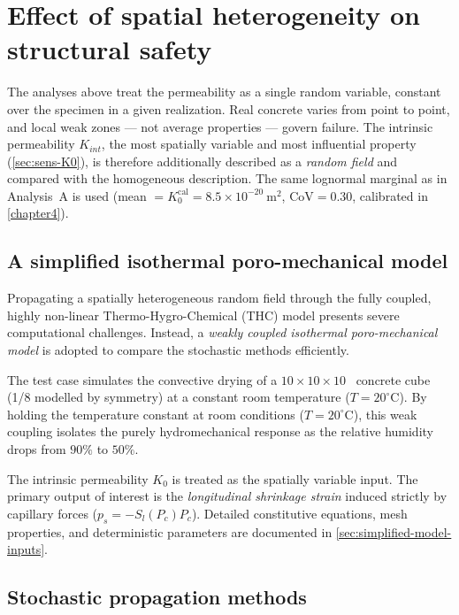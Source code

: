 \section{Effect of spatial heterogeneity on structural safety} \label{sec:spatial-effect}
 
The analyses above treat the permeability as a single random variable, constant over the specimen in a given realization. Real concrete varies from point to point, and local weak zones --- not average properties --- govern failure. The intrinsic permeability $K_{int}$, the most spatially variable and most influential property (\cref{sec:sens-K0}), is therefore additionally described as a \emph{random field} and compared with the homogeneous description. The same lognormal marginal as in Analysis~A is used (mean $=K_0^{\mathrm{cal}}=8.5\times10^{-20}~\si{\square\meter}$, $\mathrm{CoV}=0.30$, calibrated in \cref{chapter4}).
 
\subsection{A simplified isothermal poro-mechanical model} \label{sec:spatial-model}
Propagating a spatially heterogeneous random field through the fully coupled, highly non-linear Thermo-Hygro-Chemical (THC) model presents severe computational challenges. Instead, a \emph{weakly coupled isothermal poro-mechanical model} is adopted to compare the stochastic methods efficiently. 

The test case simulates the convective drying of a $10 \times 10 \times 10$~ concrete cube (1/8 modelled by symmetry) at a constant room temperature ($T=20^\circ\mathrm{C}$). By holding the temperature constant at room conditions ($T=20^\circ\mathrm{C}$), this weak coupling isolates the purely hydromechanical response as the relative humidity drops from $90\%$ to $50\%$.

The intrinsic permeability $K_0$ is treated as the spatially variable input. The primary output of interest is the \emph{longitudinal shrinkage strain} induced strictly by capillary forces ($p_s = -S_l(P_c) P_c$). Detailed constitutive equations, mesh properties, and deterministic parameters are documented in \cref{sec:simplified-model-inputs}.

\subsection{Stochastic propagation methods} \label{sec:spatial-methods}
 

